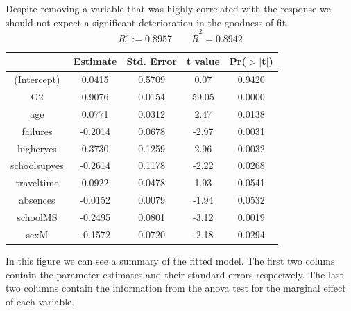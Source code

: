 \documentclass[a4paper, 11pt]{article}
\theoremstyle{definition}
\numberwithin{equation}{section}		%
\numberwithin{table}{section}				%
\begin{document}
\bigskip
Despite removing a variable that was highly correlated with the response we should not expect a significant deterioration in the goodness of fit.
$$\boxed{R^2 := 0.8957 \quad \quad  \tilde{R}^2 =  0.8942}$$
\bigskip
\begin{table}[H]
\centering
\begin{tabular}{ccccc}
\hline
  & Estimate & Std. Error & t value & Pr($>$$|$t$|$) \\ 
  \hline
(Intercept) & 0.0415 & 0.5709 & 0.07 & 0.9420 \\ 
  G2 & 0.9076 & 0.0154 & 59.05 & 0.0000 \\ 
  age & 0.0771 & 0.0312 & 2.47 & 0.0138 \\ 
  failures & -0.2014 & 0.0678 & -2.97 & 0.0031 \\ 
  higheryes & 0.3730 & 0.1259 & 2.96 & 0.0032 \\ 
  schoolsupyes & -0.2614 & 0.1178 & -2.22 & 0.0268 \\ 
  traveltime & 0.0922 & 0.0478 & 1.93 & 0.0541 \\ 
  absences & -0.0152 & 0.0079 & -1.94 & 0.0532 \\ 
  schoolMS & -0.2495 & 0.0801 & -3.12 & 0.0019 \\ 
  sexM & -0.1572 & 0.0720 & -2.18 & 0.0294 \\ 
   \hline
\end{tabular}
\end{table}

In this figure we can see a summary of the fitted model. The first two colums contain the parameter estimates and their standard errors respectvely. The last two columns contain the information from the anova test for the marginal effect of each variable. \bigskip
\end{document}
